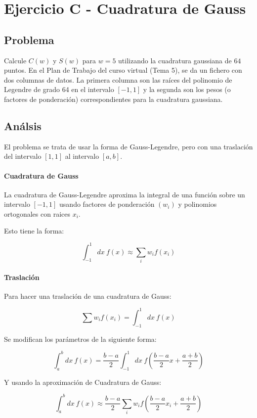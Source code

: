 \section{Ejercicio C - Cuadratura de Gauss}


\subsection{Problema}

Calcule $C(w)$ y $S(w)$ para $w = 5$ utilizando la cuadratura gaussiana de $64$ puntos. En el Plan de Trabajo del curso virtual (Tema 5), se da un fichero con dos columnas de datos. La primera columna son las raíces del polinomio de Legendre de grado 64 en el intervalo $[-1, 1]$ y la segunda son los pesos (o factores de ponderación) correspondientes para la cuadratura gaussiana.

\subsection{Análsis}

El problema se trata de usar la forma de Gauss-Legendre, pero con una traslación del intervalo $[1, 1]$ al intervalo $[a, b]$.

\paragraph{Cuadratura de Gauss}

La cuadratura de Gauss-Legendre aproxima la integral de una función sobre un intervalo $[-1, 1]$ usando factores de ponderación $(w_i)$ y polinomios ortogonales con raices $x_i$.

Esto tiene la forma:

$$
\int_{-1}^{1} dx ~ f(x) 
\approx \sum_{i} w_i f(x_i)
$$


\paragraph{Traslación}
Para hacer una traslación de una cuadratura de Gauss:

$$ \sum w_i f(x_i) = \int_{-1}^{1} dx ~ f(x) $$ 

Se modifican los parámetros de la siguiente forma: 

$$
\int_{a}^{b}dx~ f(x) = \frac{b - a}{2} \int_{-1}^{1} dx ~ f( \frac{b-a}{2} x + \frac{a + b}{2})
$$

Y usando la aproximación de Cuadratura de Gauss:

\begin{equation}
\int_{a}^{b}dx~ f(x) \approx
\frac{b - a}{2}
\sum_{i}w_i f(\frac{b-a}{2} x_i + \frac{a + b}{2} )
\end{equation}




